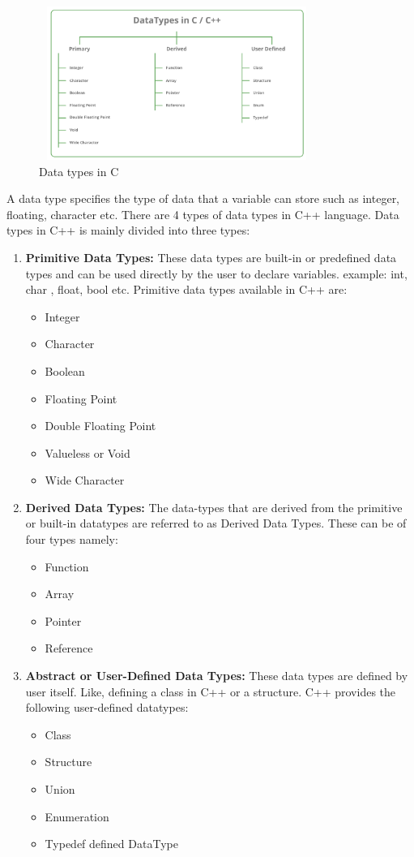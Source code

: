 \documentclass{book}
\begin{document}
\begin{figure}[h]
\centering 
\includegraphics[width=9cm, height=5cm]{datatypesinc}%
\caption{Data types in C}%
\label{}%
\end{figure}

A data type specifies the type of data that a variable can store such as integer, floating, character etc. There are 4 types of data types in C++ language. Data types in C++ is mainly divided into three types: 

\begin{enumerate}
	\item \textbf{Primitive Data Types:} These data types are built-in or predefined data types and can be used directly by the user to declare variables. example: int, char , float, bool etc. Primitive data types available in C++ are: 
	\begin{itemize}
		\item Integer
\item Character
\item Boolean
\item Floating Point
\item Double Floating Point
\item Valueless or Void
\item Wide Character
\end{itemize}

\item \textbf{Derived Data Types:} The data-types that are derived from the primitive or built-in datatypes are referred to as Derived Data Types. These can be of four types namely: 
\begin{itemize}
	\item Function
\item Array
\item Pointer
\item Reference
\end{itemize}
\item \textbf{Abstract or User-Defined Data Types:} These data types are defined by user itself. Like, defining a class in C++ or a structure. C++ provides the following user-defined datatypes: 
\begin{itemize}
	\item Class
\item Structure
\item Union
\item Enumeration
\item Typedef defined DataType
\end{itemize}
\end{enumerate}
\end{document}
